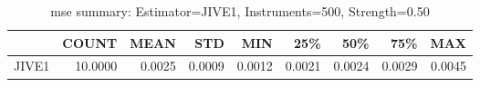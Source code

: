 \begin{table}[ht]
\centering
\caption{mse summary: Estimator=JIVE1, Instruments=500, Strength=0.50}
\begin{tabular}{lrrrrrrrr}
\toprule
 & COUNT & MEAN & STD & MIN & 25\% & 50\% & 75\% & MAX \\
\midrule
JIVE1 & 10.0000 & 0.0025 & 0.0009 & 0.0012 & 0.0021 & 0.0024 & 0.0029 & 0.0045 \\
\bottomrule
\end{tabular}
\end{table}
